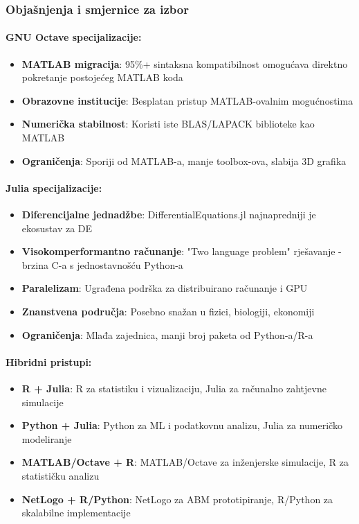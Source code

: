 \documentclass[11pt,oneside]{book}
\begin{document}
\vspace{1em}

\subsubsection{Objašnjenja i smjernice za izbor}

\paragraph{GNU Octave specijalizacije:}
\begin{itemize}
	\item \textbf{MATLAB migracija}: 95\%+ sintaksna kompatibilnost omogućava direktno pokretanje postojećeg MATLAB koda
	\item \textbf{Obrazovne institucije}: Besplatan pristup MATLAB-ovalnim mogućnostima
	\item \textbf{Numerička stabilnost}: Koristi iste BLAS/LAPACK biblioteke kao MATLAB
	\item \textbf{Ograničenja}: Sporiji od MATLAB-a, manje toolbox-ova, slabija 3D grafika
\end{itemize}

\paragraph{Julia specijalizacije:}
\begin{itemize}
	\item \textbf{Diferencijalne jednadžbe}: DifferentialEquations.jl najnapredniji je ekosustav za DE
	\item \textbf{Visokomperformantno računanje}: "Two language problem" rješavanje - brzina C-a s jednostavnošću Python-a
	\item \textbf{Paralelizam}: Ugrađena podrška za distribuirano računanje i GPU
	\item \textbf{Znanstvena područja}: Posebno snažan u fizici, biologiji, ekonomiji
	\item \textbf{Ograničenja}: Mlađa zajednica, manji broj paketa od Python-a/R-a
\end{itemize}

\paragraph{Hibridni pristupi:}
\begin{itemize}
	\item \textbf{R + Julia}: R za statistiku i vizualizaciju, Julia za računalno zahtjevne simulacije
	\item \textbf{Python + Julia}: Python za ML i podatkovnu analizu, Julia za numeričko modeliranje  
	\item \textbf{MATLAB/Octave + R}: MATLAB/Octave za inženjerske simulacije, R za statističku analizu
	\item \textbf{NetLogo + R/Python}: NetLogo za ABM prototipiranje, R/Python za skalabilne implementacije
\end{itemize}
\end{document}
